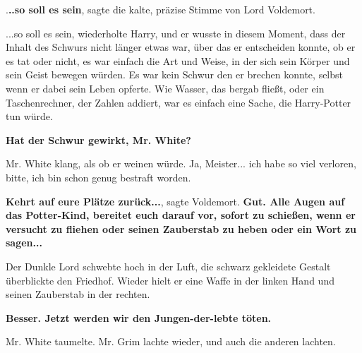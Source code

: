 \glqq{}.\textbf{..so soll es sein}\grqq{}, sagte die kalte, präzise Stimme von
Lord Voldemort.

\glqq{}...so soll es sein\grqq{}, wiederholte Harry, und er wusste in diesem
Moment, dass der Inhalt des Schwurs nicht länger etwas war, über das er
entscheiden konnte, ob er es tat oder nicht, es war einfach die Art und Weise,
in der sich sein Körper und sein Geist bewegen würden. Es war kein Schwur den er
brechen konnte, selbst wenn er dabei sein Leben opferte. Wie Wasser, das bergab
fließt, oder ein Taschenrechner, der Zahlen addiert, war es einfach eine Sache,
die Harry-Potter tun würde.

\glqq{}\textbf{Hat der Schwur gewirkt, Mr. White?}\grqq{}

Mr. White klang, als ob er weinen würde. \glqq{}Ja, Meister... ich habe so viel
verloren, bitte, ich bin schon genug bestraft worden.\grqq{}

\glqq{}\textbf{Kehrt auf eure Plätze zurück...}\grqq{}, sagte Voldemort. \glqq{}
\textbf{Gut. Alle Augen auf das Potter-Kind, bereitet euch darauf vor, sofort zu
schießen, wenn er versucht zu fliehen oder seinen Zauberstab zu heben oder ein
Wort zu sagen...}\grqq{}

Der Dunkle Lord schwebte hoch in der Luft, die schwarz gekleidete Gestalt
überblickte den Friedhof. Wieder hielt er eine Waffe in der linken Hand und
seinen Zauberstab in der rechten.

\glqq{}\textbf{Besser. Jetzt werden wir den Jungen-der-lebte töten.}\grqq{}

Mr. White taumelte. Mr. Grim lachte wieder, und auch die anderen lachten.

